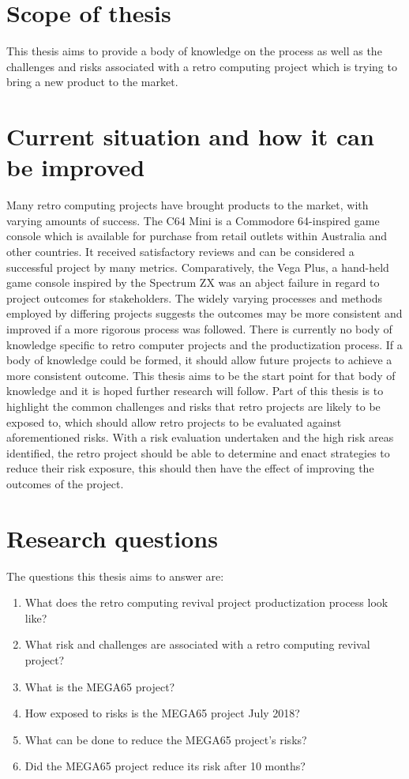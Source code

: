 \section{Scope of thesis}
This thesis aims to provide a body of knowledge on the process as well as the challenges and risks associated with a retro computing project which is trying to bring a new product to the market.


\section{Current situation and how it can be improved}
Many retro computing projects have brought products to the market, with varying amounts of success. The C64 Mini is a Commodore 64-inspired game console which is available for purchase from retail outlets within Australia and other countries. It received satisfactory reviews and can be considered a successful project by many metrics. Comparatively, the Vega Plus, a hand-held game console inspired by the Spectrum ZX was an abject failure in regard to project outcomes for stakeholders. The widely varying processes and methods employed by differing projects suggests the outcomes may be more consistent and improved if a more rigorous process was followed. There is currently no body of knowledge specific to retro computer projects and the productization process. If a body of knowledge could be formed, it should allow future projects to achieve a more consistent outcome. This thesis aims to be the start point for that body of knowledge and it is hoped further research will follow. Part of this thesis is to highlight the common challenges and risks that retro projects are likely to be exposed to, which should allow retro projects to be evaluated against aforementioned risks. With a risk evaluation undertaken and the high risk areas identified, the retro project should be able to determine and enact strategies to reduce their risk exposure, this should then have the effect of improving the outcomes of the project.


\section{Research questions}
The questions this thesis aims to answer are:
\begin{enumerate}
\item What does the retro computing revival project productization process look like?
\item What risk and challenges are associated with a retro computing revival project?
\item What is the MEGA65 project? 
\item How exposed to risks is the MEGA65 project July 2018?
\item What can be done to reduce the MEGA65 project's risks?
\item Did the MEGA65 project reduce its risk after 10 months?
\end{enumerate}


